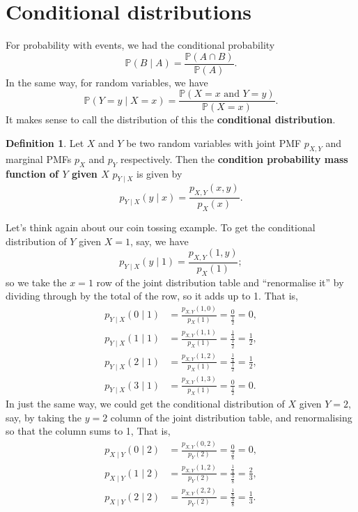 \documentclass[
  a4paper,
]{book}
\theoremstyle{definition}
\newtheorem{definition}{Definition}[chapter]
\theoremstyle{definition}
\theoremstyle{definition}
\theoremstyle{definition}
\theoremstyle{remark}
\begin{document}
\hypertarget{cond-rv}{%
\section{Conditional distributions}\label{cond-rv}}

For probability with events, we had the conditional probability
\[ \mathbb P(B \mid A) = \frac{\mathbb P(A \cap B)}{\mathbb P(A)} . \]
In the same way, for random variables, we have
\[ \mathbb P(Y = y \mid X = x) = \frac{\mathbb P(X = x \text{ and } Y = y)}{\mathbb P(X = x)} . \]
It makes sense to call the distribution of this the \textbf{conditional distribution}.

\begin{definition}
Let \(X\) and \(Y\) be two random variables with joint PMF \(p_{X,Y}\) and marginal PMFs \(p_X\) and \(p_Y\) respectively. Then the \textbf{condition probability mass function of \(Y\) given \(X\)} \(p_{Y \mid X}\) is given by
\[ p_{Y \mid X}(y \mid x) = \frac{p_{X,Y}(x,y)}{p_X(x)} .   \]
\end{definition}

Let's think again about our coin tossing example. To get the conditional distribution of \(Y\) given \(X = 1\), say, we have
\[ p_{Y \mid X}(y \mid 1) = \frac{p_{X,Y}(1,y)}{p_X(1)} ;   \]
so we take the \(x = 1\) row of the joint distribution table and ``renormalise it'' by dividing through by the total of the row, so it adds up to 1. That is,
\begin{align*}
  p_{Y \mid X} (0 \mid 1) &= \frac{p_{X,Y}(1, 0)}{p_X(1)} = \frac{0}{\frac12} = 0 , \\
  p_{Y \mid X} (1 \mid 1) &= \frac{p_{X,Y}(1, 1)}{p_X(1)} = \frac{\frac14}{\frac12} = \tfrac12 , \\
  p_{Y \mid X} (2 \mid 1) &= \frac{p_{X,Y}(1, 2)}{p_X(1)} = \frac{\frac14}{\frac12} = \tfrac12 , \\
  p_{Y \mid X} (3 \mid 1) &= \frac{p_{X,Y}(1, 3)}{p_X(1)} = \frac{0}{\frac12} = 0 .
\end{align*}
In just the same way, we could get the conditional distribution of \(X\) given \(Y = 2\), say, by taking the \(y = 2\) column of the joint distribution table, and renormalising so that the column sums to 1, That is,
\begin{align*}
  p_{X \mid Y} (0 \mid 2) &= \frac{p_{X,Y}(0,2)}{p_Y(2)} = \frac{0}{\frac38} = 0 , \\
  p_{X \mid Y} (1 \mid 2) &= \frac{p_{X,Y}(1,2)}{p_Y(2)} = \frac{\frac14}{\frac38} = \tfrac23 , \\
  p_{X \mid Y} (2 \mid 2) &= \frac{p_{X,Y}(2,2)}{p_Y(2)} = \frac{\frac18}{\frac38} = \tfrac13 .
\end{align*}
\end{document}
